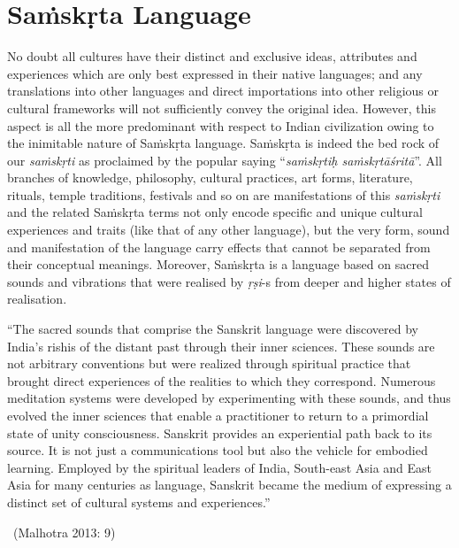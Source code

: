 \section*{Saṁskṛta Language}

No doubt all cultures have their distinct and exclusive ideas, attributes and experiences which are only best expressed in their native languages; and any translations into other languages and direct importations into other religious or cultural frameworks will not sufficiently convey the original idea. However, this aspect is all the more predominant with respect to Indian civilization owing to the inimitable nature of Saṁskṛta language. Saṁskṛta is indeed the bed rock of our \textit{saṁskṛti} as proclaimed by the popular saying “\textit{saṁskṛtiḥ saṁskṛtāśritā}”. All branches of knowledge, philosophy, cultural practices, art forms, literature, rituals, temple traditions, festivals and so on are manifestations of this \textit{saṁskṛti} and the related Saṁskṛta terms not only encode specific and unique cultural experiences and traits (like that of any other language), but the very form, sound and manifestation of the language carry effects that cannot be separated from their conceptual meanings. Moreover, Saṁskṛta is a language based on sacred sounds and vibrations that were realised by \textit{ṛṣi}-s from deeper and higher states of realisation.

\begin{myquote}
“The sacred sounds that comprise the Sanskrit language were discovered by India’s rishis of the distant past through their inner sciences. These sounds are not arbitrary conventions but were realized through spiritual practice that brought direct experiences of the realities to which they correspond. Numerous meditation systems were developed by experimenting with these sounds, and thus evolved the inner sciences that enable a practitioner to return to a primordial state of unity consciousness. Sanskrit provides an experiential path back to its source. It is not just a communications tool but also the vehicle for embodied learning. Employed by the spiritual leaders of India, South-east Asia and East Asia for many centuries as language, Sanskrit became the medium of expressing a distinct set of cultural systems and experiences.” 

~\hfill (Malhotra 2013: 9)
\end{myquote}


